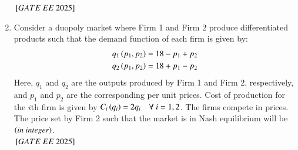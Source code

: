 \documentclass[journal,12pt,onecolumn]{IEEEtran}
\theoremstyle{remark}
\begin{document}
\begin{enumerate}
\begin{center}

\end{center} 
 \hfill ${}\left[GATE\ EE\ 2025\right]$
\item Consider a duopoly market where Firm 1 and Firm 2 produce differentiated products such that the demand function of each firm is given by:
\begin{align*}
q_1\left(p_1, p_2\right) &= 18 - p_1 + p_2 \\
q_2\left(p_1, p_2\right) &= 18 + p_1 - p_2
\end{align*}
Here, $q_1$ and $q_2$ are the outputs produced by Firm 1 and Firm 2, respectively, and $p_1$ and $p_2$ are the corresponding per unit prices. Cost of production for the $i$th firm is given by $C_i\left(q_i\right) = 2q_i \quad \forall~i=1,2$. The firms compete in prices. The price set by Firm 2 such that the market is in Nash equilibrium will be \underline{\hspace{2cm}} $\left(in\ integer\right)$.\\

 \hfill ${}\left[GATE\ EE\ 2025\right]$
\end{enumerate}
\renewcommand{\thefigure}{\theenumi}
\renewcommand{\thetable}{\theenumi}
\end{document}

